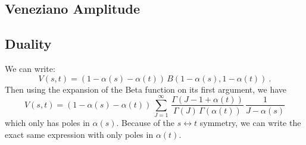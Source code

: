 \begin{enumerate}
\begin{solution}
              \section{Veneziano Amplitude}
              \subsection{Duality}
              We can write:
              \begin{equation}
                  V(s,t) = (1-\alpha(s) - \alpha(t)) \, B(1-\alpha(s), 1-\alpha(t)) ~.
              \end{equation}
              Then using the expansion of the Beta function on its first argument, we have
              \begin{equation}
                  V(s,t) = (1-\alpha(s) - \alpha(t)) \, \sum_{J=1}^\infty \, \frac{\Gamma(J-1+\alpha(t))}{\Gamma(J) \, \Gamma(\alpha(t))} \, \frac{1}{J-\alpha(s)}
              \end{equation}
              which only has poles in $\alpha(s)$. Because of the $s\leftrightarrow t$ symmetry, we can write the exact same expression with only poles in $\alpha(t)$.
          \end{solution}

\end{enumerate}